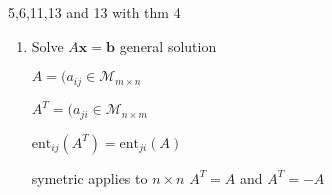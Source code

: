 \documentclass[letterpaper]{article}
\begin{document}
5,6,11,13 and 13 with thm 4

\begin{enumerate}
\item
Solve $A\mathbf{x}=\mathbf{b}$ general solution

$A=(a_{ij}\in \mathcal{M}_{m\times n}$

$A^{T}=(a_{ji}\in \mathcal{M}_{n\times m}$

$\text{ent}_{ij}(A^{T})=\text{ent}_{ji}(A)$

symetric applies to $n\times n$
$A^T=A$ and $A^T=-A$

\end{enumerate}
\end{document}
